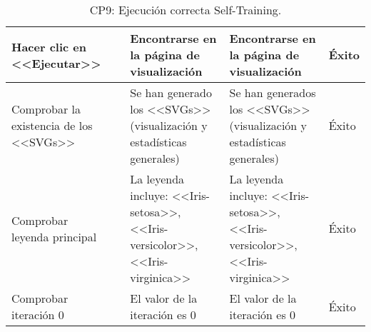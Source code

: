 \begin{table}[H]
\begin{tabular}{p{}p{}p{}p{}p{}}
Hacer clic en <<Ejecutar>>                            &                        & Encontrarse en la página de visualización                            & Encontrarse en la página de visualización                    & Éxito                            \\ \hline
Comprobar la existencia de los <<SVGs>>               &                        & Se han generado los <<SVGs>> (visualización y estadísticas generales) & Se han generados los <<SVGs>> (visualización y estadísticas generales)& Éxito  \\ \hline 
Comprobar leyenda principal                           &                        & La leyenda incluye: <<Iris-setosa>>, <<Iris-versicolor>>, <<Iris-virginica>> & La leyenda incluye: <<Iris-setosa>>, <<Iris-versicolor>>, <<Iris-virginica>> & Éxito \\ \hline
Comprobar iteración 0                                 &                        & El valor de la iteración es 0                                        & El valor de la iteración es 0                                & Éxito \\ \hline
\end{tabular}
\caption{CP9: Ejecución correcta Self-Training.}
\end{table}


